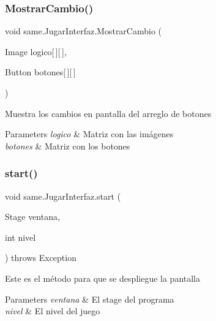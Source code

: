 \subsubsection{\texorpdfstring{Mostrar\+Cambio()}{MostrarCambio()}}
{\footnotesize\ttfamily void same.\+Jugar\+Interfaz.\+Mostrar\+Cambio (\begin{DoxyParamCaption}\item[{Image}]{logico\mbox{[}$\,$\mbox{]}\mbox{[}$\,$\mbox{]},  }\item[{Button}]{botones\mbox{[}$\,$\mbox{]}\mbox{[}$\,$\mbox{]} }\end{DoxyParamCaption})}

Muestra los cambios en pantalla del arreglo de botones 
\begin{DoxyParams}{Parameters}
{\em logico} & Matriz con las imágenes \\
\hline
{\em botones} & Matriz con los botones\\
\hline
\end{DoxyParams}
\mbox{\label{classsame_1_1_jugar_interfaz_a36f21d8cd6ccb7f9984c09659ec5b35f}} 
\subsubsection{\texorpdfstring{start()}{start()}\hspace{0.1cm}{\footnotesize\ttfamily [1/2]}}
{\footnotesize\ttfamily void same.\+Jugar\+Interfaz.\+start (\begin{DoxyParamCaption}\item[{Stage}]{ventana,  }\item[{int}]{nivel }\end{DoxyParamCaption}) throws Exception}

Este es el método para que se despliegue la pantalla 
\begin{DoxyParams}{Parameters}
{\em ventana} & El stage del programa \\
\hline
{\em nivel} & El nivel del juego\\
\hline
\end{DoxyParams}
\mbox{\label{classsame_1_1_jugar_interfaz_ac8c1c753ea40ce008a638af34e91aeda}} 
